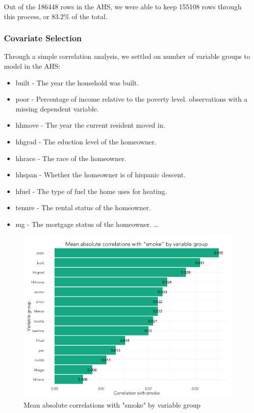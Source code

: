 \documentclass{sig-alternate}
\begin{document}
Out of the 186448 rows in the AHS, we were able to keep 155108 rows through this process, or 83.2\% of the total. 

\subsubsection{Covariate Selection}

Through a simple correlation analysis, we settled on number of variable groups to model in the AHS:

\begin{itemize} 
\item built - The year the household was built. 
\item poor - Percentage of income relative to the poverty level. observations with a missing dependent variable.
\item hhmove - The year the current resident moved in.
\item hhgrad - The eduction level of the homeowner.
\item hhrace - The race of the homeowner.
\item hhspan - Whether the homeowner is of hispanic descent.
\item hfuel - The type of fuel the home uses for heating. 
\item tenure - The rental status of the homeowner.
\item mg - The mortgage status of the homeowner.
\ldots 
\end{itemize}

\begin{figure}
\centering 
\includegraphics[scale=0.42]{explore-correlations-1-2.png}
\caption{Mean absolute correlations with "smoke" by variable group}
\end{figure}
\end{document}
